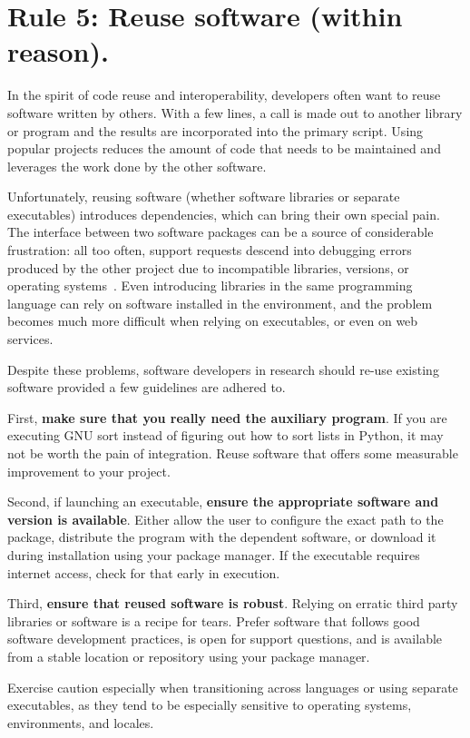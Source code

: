 \documentclass[10pt,letterpaper]{article}
\newcommand{\rulemajor}[1]{\section{#1}}
\newcommand{\ruleminor}[1]{\textbf{#1}}
\begin{document}
\rulemajor{Rule 5: Reuse software (within reason).}

In the spirit of code reuse and interoperability, developers often want
to reuse software written by others. 
With a few lines, a call
is made out to another library or program and the results are incorporated into the
primary script. Using popular projects reduces the amount of code that
needs to be maintained and leverages the work done by the other software.

Unfortunately, reusing software (whether software libraries or separate executables)
introduces dependencies, which can
bring their own special pain. The interface between two software
packages can be a source of considerable frustration: all too
often, support requests descend into debugging errors produced by the
other project due to incompatible libraries, versions, or operating
systems~\cite{brown2013}. Even introducing libraries in the same programming
language can rely on software installed in the environment, and the problem
becomes much more difficult when relying on executables, or even on web
services.

Despite these problems, software developers in research should
re-use existing software provided a few guidelines are adhered to.

First, 
\ruleminor{make sure that you really need the auxiliary program}. If you are
executing GNU sort instead of figuring out how to sort lists in Python,
it may not be worth the pain of integration. Reuse software that offers some
measurable improvement to your project.

Second, if launching an executable, \ruleminor{ensure the appropriate software and version is available}.
Either allow the user to
configure the exact path to the package, distribute the program with the
dependent software, or download it during installation using your
package manager. If the executable requires internet access, check for that
early in execution.

Third, \ruleminor{ensure that reused software is robust}. Relying on erratic third
party libraries or software is a recipe for tears. Prefer software that follows
good software development practices, is open for support questions, and is
available from a stable location or repository using your package manager.

Exercise caution especially when transitioning across languages or using
separate executables, as they tend to be especially sensitive to operating
systems, environments, and locales. 
\end{document}
